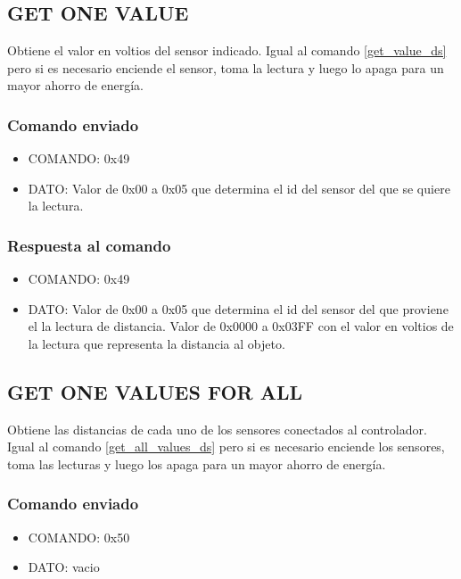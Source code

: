 \documentclass[a4paper,10pt]{article}
\begin{document}
\subsection{GET ONE VALUE}
\label{get_one_value_ds}

Obtiene el valor en voltios del sensor indicado.
Igual al comando \ref{get_value_ds} pero si es necesario enciende el sensor, toma la lectura y luego lo apaga para un mayor ahorro de energ\'ia.

\subsubsection*{Comando enviado}

\begin{itemize}
	\item{COMANDO:} 0x49
	\item{DATO:} Valor de 0x00 a 0x05 que determina el id del sensor del que se quiere la lectura.
\end{itemize}

\subsubsection*{Respuesta al comando}

\begin{itemize}
	\item{COMANDO:} 0x49
	\item{DATO:} Valor de 0x00 a 0x05 que determina el id del sensor del que proviene el la lectura de distancia.
	Valor de 0x0000 a 0x03FF con el valor en voltios de la lectura que representa la distancia al objeto.
\end{itemize}

\subsection{GET ONE VALUES FOR ALL}
\label{get_one_values_for_all_ds}

Obtiene las distancias de cada uno de los sensores conectados al controlador.
Igual al comando \ref{get_all_values_ds} pero si es necesario enciende los sensores, toma las lecturas y luego los apaga para un mayor ahorro de energ\'ia.

\subsubsection*{Comando enviado}

\begin{itemize}
	\item{COMANDO:} 0x50
	\item{DATO:} vacio
\end{itemize}
\end{document}

